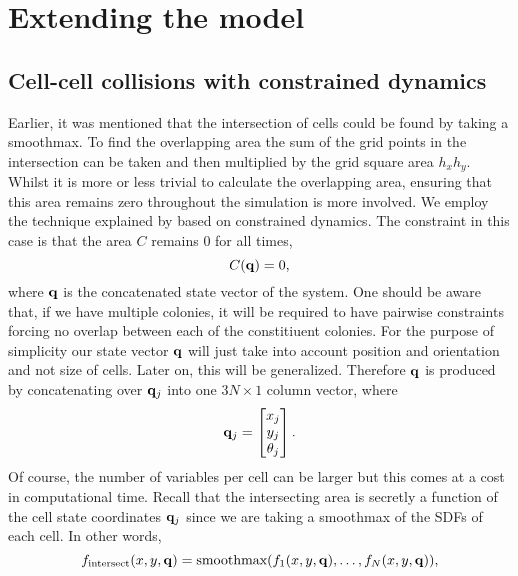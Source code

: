 
\chapter{Extending the model}

\section{Cell-cell collisions with constrained dynamics}
Earlier, it was mentioned that the intersection of cells could be found by taking a smoothmax. To find the overlapping area
the sum of the grid points in the intersection can be taken and then multiplied by the grid square area $h_x h_y$. Whilst
it is more or less trivial to calculate the overlapping area, ensuring that this area remains zero throughout the simulation
is more involved. We employ the technique explained by \cite{witkin1997introduction} based on constrained
dynamics. The constraint in this case is that the area $C$ remains $0$ for all times,
\begin{equation}
    C(\vb{q}) = 0,
\end{equation}
where $\vb{q}$ is the concatenated state vector of the system. One should be aware that, if we have multiple colonies, it will
be required to have pairwise constraints forcing no overlap between each of the constitiuent colonies. For the purpose of simplicity
our state vector $\vb{q}$ will just take into account position and orientation and not size of cells. Later on, this will be generalized.
Therefore $\vb{q}$ is produced by concatenating over $\vb{q}_j$ into one $3N \times 1$ column vector, where
\begin{equation}
\vb{q}_j = \begin{bmatrix}
                x_j \\
                y_j \\
                \theta_j
            \end{bmatrix}.
\end{equation}
Of course, the number of variables per cell can be larger but this comes at a cost in computational time. Recall that the 
intersecting area is secretly a function of the cell state coordinates $\vb{q}_j$ since we are taking a smoothmax of the SDFs 
of each cell. In other words,
\begin{equation*}
f_{\textrm{intersect}}(x,y,\vb{q}) = \textrm{smoothmax}(f_1(x,y,\vb{q}) , \ldots, f_N(x,y,\vb{q}) ),
\end{equation*}

